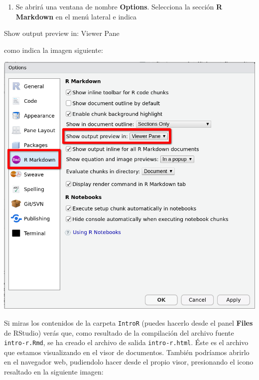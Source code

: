 \documentclass[
  degree=mecinf,
  title=normal,
  toc=normal,
  bib=normal]{mnye}
\newenvironment{menu}{
    \begin{center}
    \sffamily\bfseries
}{
    \end{center}
}
\providecommand{\tightlist}{%
  \setlength{\itemsep}{0pt}\setlength{\parskip}{0pt}}
\begin{document}
\begin{enumerate}
\def\labelenumi{\arabic{enumi}.}
\setcounter{enumi}{1}
\tightlist
\item
  Se abrirá una ventana de nombre \textbf{Options}. Selecciona la sección \textbf{R Markdown} en el menú lateral e indica
\end{enumerate}

\begin{menu}
Show output preview in: Viewer Pane

\end{menu}

como indica la imagen siguiente:

\begin{center}\includegraphics[width=1\linewidth]{images/options-r-markdown} \end{center}

Si miras los contenidos de la carpeta \texttt{IntroR} (puedes hacerlo desde el panel \textbf{Files} de \textsf{RStudio}) verás que, como resultado de la compilación del archivo fuente \texttt{intro-r.Rmd}, se ha creado el archivo de salida \texttt{intro-r.html}. Éste es el archivo que estamos visualizando en el visor de documentos. También podríamos abrirlo en el navegador web, pudiendolo hacer desde el propio visor, presionando el icono resaltado en la siguiente imagen:
\end{document}
